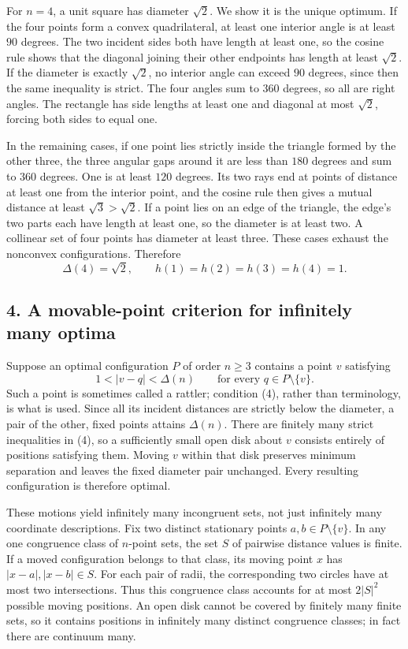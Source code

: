 For $n=4$, a unit square has diameter $\sqrt2$. We show it is the unique optimum. If the four points form a convex quadrilateral, at least one interior angle is at least $90$ degrees. The two incident sides both have length at least one, so the cosine rule shows that the diagonal joining their other endpoints has length at least $\sqrt2$. If the diameter is exactly $\sqrt2$, no interior angle can exceed $90$ degrees, since then the same inequality is strict. The four angles sum to $360$ degrees, so all are right angles. The rectangle has side lengths at least one and diagonal at most $\sqrt2$, forcing both sides to equal one.

In the remaining cases, if one point lies strictly inside the triangle formed by the other three, the three angular gaps around it are less than $180$ degrees and sum to $360$ degrees. One is at least $120$ degrees. Its two rays end at points of distance at least one from the interior point, and the cosine rule then gives a mutual distance at least $\sqrt3>\sqrt2$. If a point lies on an edge of the triangle, the edge's two parts each have length at least one, so the diameter is at least two. A collinear set of four points has diameter at least three. These cases exhaust the nonconvex configurations. Therefore
\[
 \Delta(4)=\sqrt2,\qquad h(1)=h(2)=h(3)=h(4)=1.\tag{3}
\]

\subsection*{4. A movable-point criterion for infinitely many optima}
Suppose an optimal configuration $P$ of order $n\ge3$ contains a point $v$ satisfying
\[
 1<|v-q|<\Delta(n)\qquad\text{for every }q\in P\setminus\{v\}.\tag{4}
\]
Such a point is sometimes called a rattler; condition (4), rather than terminology, is what is used. Since all its incident distances are strictly below the diameter, a pair of the other, fixed points attains $\Delta(n)$. There are finitely many strict inequalities in (4), so a sufficiently small open disk about $v$ consists entirely of positions satisfying them. Moving $v$ within that disk preserves minimum separation and leaves the fixed diameter pair unchanged. Every resulting configuration is therefore optimal.

These motions yield infinitely many incongruent sets, not just infinitely many coordinate descriptions. Fix two distinct stationary points $a,b\in P\setminus\{v\}$. In any one congruence class of $n$-point sets, the set $S$ of pairwise distance values is finite. If a moved configuration belongs to that class, its moving point $x$ has $|x-a|,|x-b|\in S$. For each pair of radii, the corresponding two circles have at most two intersections. Thus this congruence class accounts for at most $2|S|^2$ possible moving positions. An open disk cannot be covered by finitely many finite sets, so it contains positions in infinitely many distinct congruence classes; in fact there are continuum many.


